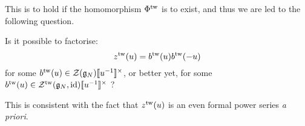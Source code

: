            This is to hold if the homomorphism $\Phi^{\mathrm{tw}}$ is to exist, and thus we are led to the following question.
            \begin{question} \label{question: square_roots_of_twsited_quantum_contractions}
                Is it possible to factorise:
                    \begin{equation} \label{equation: square_roots_of_twisted_quantum_contractions}
                        z^{\mathrm{tw}}(u) = b^{\mathrm{tw}}(u) b^{\mathrm{tw}}(-u)
                    \end{equation}
                for some $b^{\tw}(u) \in \calZ(\g_N)[\![u^{-1}]\!]^{\x}$, or better yet, for some $b^{\tw}(u) \in \calZ^{\tw}(\g_N, \id)[\![u^{-1}]\!]^{\x}$ ?
            \end{question}
            \begin{remark}
                This is consistent with the fact that $z^{\mathrm{tw}}(u)$ is an even formal power series \textit{a priori}.
            \end{remark}

